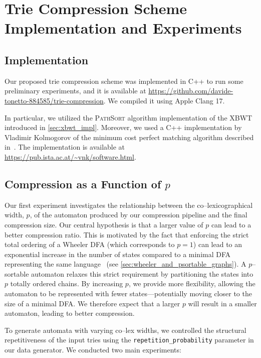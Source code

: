 \section{Trie Compression Scheme Implementation and Experiments}

\subsection{Implementation}
Our proposed trie compression scheme was implemented in C++ to run some preliminary experiments, and it is available at \url{https://github.com/davide-tonetto-884585/trie-compression}. We compiled it using Apple Clang 17. 

In particular, we utilized the \textsc{PathSort} algorithm implementation of the XBWT introduced in \cref{sec:xbwt_impl}. Moreover, we used a C++ implementation by Vladimir Kolmogorov of the minimum cost perfect matching algorithm described in~\cite{kolmogorovBlossomNewImplementation2009}. The implementation is available at \url{https://pub.ista.ac.at/~vnk/software.html}.

\subsection{Compression as a Function of \texorpdfstring{$p$}{p}}
Our first experiment investigates the relationship between the co--lexicographical width, $p$, of the automaton produced by our compression pipeline and the final compression size. Our central hypothesis is that a larger value of $p$ can lead to a better compression ratio. This is motivated by the fact that enforcing the strict total ordering of a Wheeler DFA (which corresponds to $p=1$) can lead to an exponential increase in the number of states compared to a minimal DFA representing the same language~\cite{manziniRationalConstructionWheeler2024} (see \cref{sec:wheeler_and_psortable_graphs}). A $p$--sortable automaton relaxes this strict requirement by partitioning the states into $p$ totally ordered chains. By increasing $p$, we provide more flexibility, allowing the automaton to be represented with fewer states—potentially moving closer to the size of a minimal DFA. We therefore expect that a larger $p$ will result in a smaller automaton, leading to better compression.

To generate automata with varying co--lex widths, we controlled the structural repetitiveness of the input tries using the \texttt{repetition\_probability} parameter in our data generator. We conducted two main experiments:

